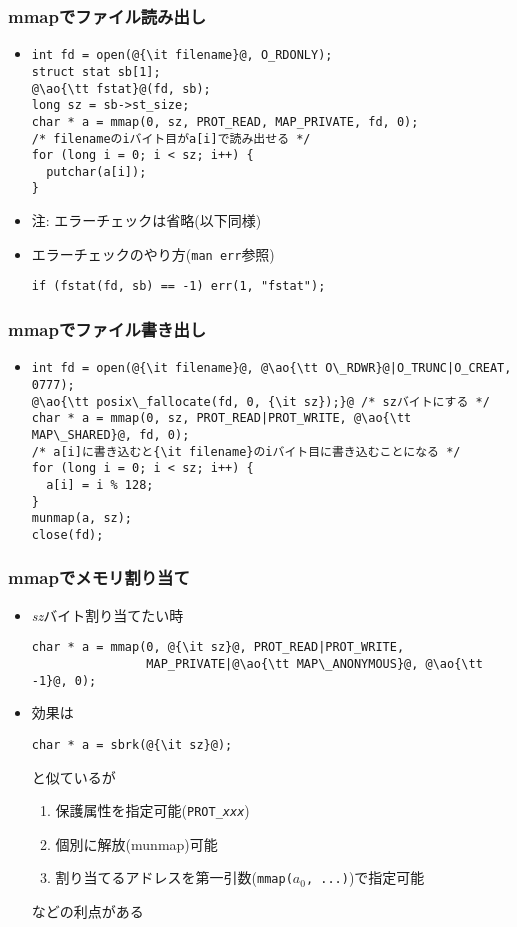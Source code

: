 \documentclass[12pt,dvipdfmx]{beamer}
\begin{document}
\begin{frame}[fragile]
  \frametitle{mmapでファイル読み出し}
  \begin{itemize}
  \item []
\begin{lstlisting}
int fd = open(@{\it filename}@, O_RDONLY);
struct stat sb[1];
@\ao{\tt fstat}@(fd, sb);
long sz = sb->st_size;
char * a = mmap(0, sz, PROT_READ, MAP_PRIVATE, fd, 0);
/* filenameのiバイト目がa[i]で読み出せる */
for (long i = 0; i < sz; i++) {
  putchar(a[i]);
}
\end{lstlisting}
\item 注: エラーチェックは省略(以下同様)
\item エラーチェックのやり方({\tt man err}参照)
\begin{lstlisting}
if (fstat(fd, sb) == -1) err(1, "fstat");
\end{lstlisting}
\end{itemize}
\end{frame}

\begin{frame}[fragile]
  \frametitle{mmapでファイル書き出し}
  \begin{itemize}
  \item []
\begin{lstlisting}
int fd = open(@{\it filename}@, @\ao{\tt O\_RDWR}@|O_TRUNC|O_CREAT, 0777);
@\ao{\tt posix\_fallocate(fd, 0, {\it sz});}@ /* szバイトにする */
char * a = mmap(0, sz, PROT_READ|PROT_WRITE, @\ao{\tt MAP\_SHARED}@, fd, 0);
/* a[i]に書き込むと{\it filename}のiバイト目に書き込むことになる */
for (long i = 0; i < sz; i++) {
  a[i] = i % 128;
}
munmap(a, sz);
close(fd);
\end{lstlisting}
  \end{itemize}
\end{frame}

\begin{frame}[fragile]
  \frametitle{mmapでメモリ割り当て}
  \begin{itemize}
  \item {\it sz}バイト割り当てたい時
\begin{lstlisting}
char * a = mmap(0, @{\it sz}@, PROT_READ|PROT_WRITE,
                MAP_PRIVATE|@\ao{\tt MAP\_ANONYMOUS}@, @\ao{\tt -1}@, 0);
\end{lstlisting}
  \item 効果は
\begin{lstlisting}
char * a = sbrk(@{\it sz}@);
\end{lstlisting}
と似ているが
\begin{enumerate}
\item 保護属性を指定可能({\tt PROT\_{\it xxx}})
\item 個別に解放(munmap)可能
\item 割り当てるアドレスを第一引数({\tt mmap($a_0$, ...)})で指定可能
\end{enumerate}
などの利点がある
\end{itemize}
\end{frame}
\end{document}
